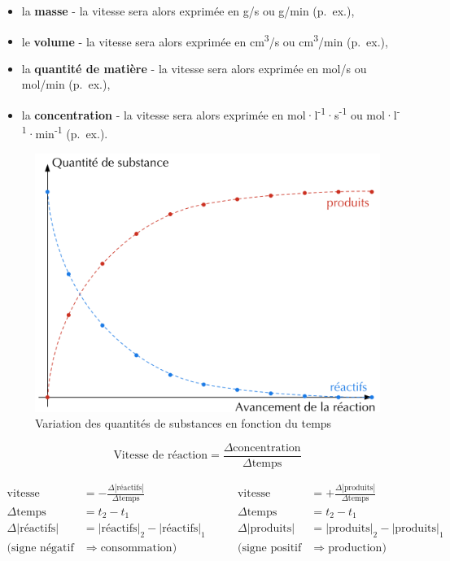 \documentclass[
  11pt,
  a4paper,
  openany]{book}
\providecommand{\tightlist}{%
  \setlength{\itemsep}{0pt}\setlength{\parskip}{0pt}}
\begin{document}
\begin{itemize}
\tightlist
\item
  la \textbf{masse} - la vitesse sera alors exprimée en g/s ou g/min (p.~ex.),
\item
  le \textbf{volume} - la vitesse sera alors exprimée en cm\textsuperscript{3}/s ou cm\textsuperscript{3}/min (p.~ex.),
\item
  la \textbf{quantité de matière} - la vitesse sera alors exprimée en mol/s ou mol/min (p.~ex.),
\item
  la \textbf{concentration} - la vitesse sera alors exprimée en mol·l\textsuperscript{-1}·s\textsuperscript{-1} ou mol·l\textsuperscript{-1}·min\textsuperscript{-1} (p.~ex.).
\end{itemize}

\begin{figure}

{\centering \includegraphics[width=0.45\linewidth]{images/vitesse-reaction-1-a} 

}

\caption{Variation des quantités de substances en fonction du temps}\label{fig:vitesse-reaction-1-a}
\end{figure}

\[
\text{Vitesse de réaction} = \frac{\Delta \text{concentration}}{\Delta \text{temps}}
\]

\[
\begin{split}
\text{vitesse} &= - \frac{\Delta |\text{réactifs}|}{\Delta \text{temps}} \\[1em]
\Delta \text{temps} &= t_2 - t_1 \\
\Delta |\text{réactifs}| &= |\text{réactifs}|_2 - |\text{réactifs}|_1 \\[1em]
(\text{signe négatif} &\Rightarrow \text{consommation})
\end{split}
\qquad
\begin{split}
\text{vitesse} &= + \frac{\Delta |\text{produits}|}{\Delta \text{temps}} \\[1em]
\Delta \text{temps} &= t_2 - t_1 \\
\Delta |\text{produits}| &= |\text{produits}|_2 - |\text{produits}|_1 \\[1em]
(\text{signe positif} &\Rightarrow \text{production})
\end{split}
\]
\end{document}
